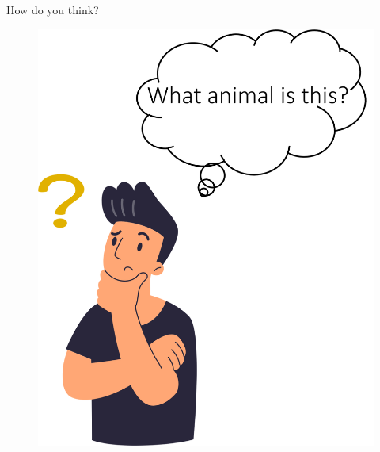 \documentclass[final]{beamer}
\newlength{\colwidth}
\begin{document}
\begin{frame}{}
\begin{columns}[t]
\begin{column}{\colwidth}
\begin{myblock}{How do you think?}
    \vspace{-1cm}
    \begin{minipage}{0.49\textwidth}
        \centering
        \begin{figure}
        \includegraphics[height=1.2\textwidth]{Images/thinking-person.png}
        \end{figure}
    \end{minipage}
    \hfill
    \begin{minipage}{0.49\textwidth}
        \centering
        \begin{figure}

\end{figure}
\end{minipage}
\end{myblock}
\end{column}
\end{columns}
\end{frame}
\end{document}
